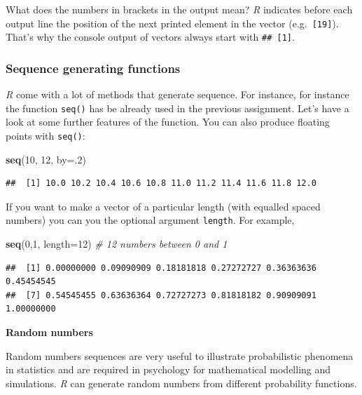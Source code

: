 \documentclass[
]{scrartcl}
\newenvironment{Shaded}{\begin{snugshade}}{\end{snugshade}}
\newcommand{\CommentTok}[1]{\textcolor[rgb]{0.56,0.35,0.01}{\textit{#1}}}
\newcommand{\DataTypeTok}[1]{\textcolor[rgb]{0.13,0.29,0.53}{#1}}
\newcommand{\DecValTok}[1]{\textcolor[rgb]{0.00,0.00,0.81}{#1}}
\newcommand{\KeywordTok}[1]{\textcolor[rgb]{0.13,0.29,0.53}{\textbf{#1}}}
\newcommand{\NormalTok}[1]{#1}
\begin{document}
What does the numbers in brackets in the output mean? \emph{R} indicates before each output line the position of the next printed element in the vector (e.g.~\texttt{{[}19{]}}). That's why the console output of vectors always start with \texttt{\#\#\ {[}1{]}}.

\hypertarget{sequence-generating-functions}{%
\subsubsection{Sequence generating functions}\label{sequence-generating-functions}}

\emph{R} come with a lot of methods that generate sequence. For instance, for instance the function \texttt{seq()} has be already used in the previous assignment. Let's have a look at some further features of the function. You can also produce floating points with \texttt{seq()}:

\begin{Shaded}
\begin{Highlighting}[]
\KeywordTok{seq}\NormalTok{(}\DecValTok{10}\NormalTok{, }\DecValTok{12}\NormalTok{, }\DataTypeTok{by=}\NormalTok{.}\DecValTok{2}\NormalTok{)}
\end{Highlighting}
\end{Shaded}

\begin{verbatim}
##  [1] 10.0 10.2 10.4 10.6 10.8 11.0 11.2 11.4 11.6 11.8 12.0
\end{verbatim}

If you want to make a vector of a particular length (with equalled spaced numbers) you can you the optional argument \texttt{length}. For example,

\begin{Shaded}
\begin{Highlighting}[]
\KeywordTok{seq}\NormalTok{(}\DecValTok{0}\NormalTok{,}\DecValTok{1}\NormalTok{, }\DataTypeTok{length=}\DecValTok{12}\NormalTok{) }\CommentTok{\# 12 numbers between 0  and 1}
\end{Highlighting}
\end{Shaded}

\begin{verbatim}
##  [1] 0.00000000 0.09090909 0.18181818 0.27272727 0.36363636 0.45454545
##  [7] 0.54545455 0.63636364 0.72727273 0.81818182 0.90909091 1.00000000
\end{verbatim}

\textbf{Random numbers}

Random numbers sequences are very useful to illustrate probabilistic phenomena in statistics and are required in psychology for mathematical modelling and simulations. \emph{R} can generate random numbers from different probability functions.
\end{document}
